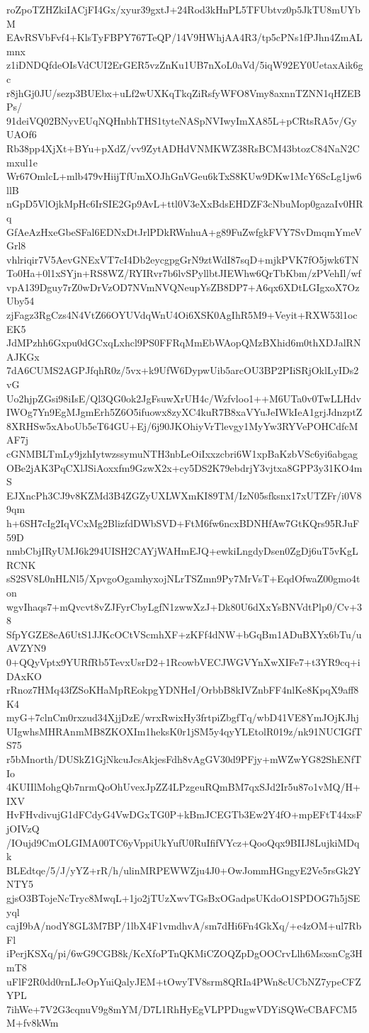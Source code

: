 roZpoTZHZkiIACjFI4Gx/xyur39gxtJ+24Rod3kHnPL5TFUbtvz0p5JkTU8mUYbM
EAvRSVbFvf4+KlsTyFBPY767TeQP/14V9HWhjAA4R3/tp5cPNs1fPJhn4ZmALmnx
z1iDNDQfdeOIsVdCUI2ErGER5vzZnKu1UB7nXoL0aVd/5iqW92EY0UetaxAik6gc
r8jhGj0JU/sezp3BUEbx+uLf2wUXKqTkqZiRsfyWFO8Vmy8axnnTZNN1qHZEBPs/
91deiVQ02BNyvEUqNQHnbhTHS1tyteNASpNVIwyImXA85L+pCRtsRA5v/GyUAOf6
Rb38pp4XjXt+BYu+pXdZ/vv9ZytADHdVNMKWZ38RsBCM43btozC84NaN2Cmxul1e
Wr67OmlcL+mlb479vHiijTfUmXOJhGnVGeu6kTxS8KUw9DKw1McY6ScLg1jw6llB
nGpD5VlOjkMpHc6IrSIE2Gp9AvL+ttl0V3eXxBdsEHDZF3cNbuMop0gazaIv0HRq
GfAeAzHxeGbeSFal6EDNxDtJrlPDkRWnhuA+g89FuZwfgkFVY7SvDmqmYmeVGrl8
vhlriqir7V5AevGNExVT7cI4Db2eycgpgGrN9ztWdI87sqD+mjkPVK7fO5jwk6TN
To0Ha+0l1xSYjn+RS8WZ/RYIRvr7b6lvSPyllbtJIEWhw6QrTbKbm/zPVehIl/wf
vpA139Dguy7rZ0wDrVzOD7NVmNVQNeupYsZB8DP7+A6qx6XDtLGIgxoX7OzUby54
zjFagz3RgCzs4N4VtZ66OYUVdqWnU4Oi6XSK0AgIhR5M9+Veyit+RXW53l1ocEK5
JdMPzhh6Gxpu0dGCxqLxhcl9PS0FFRqMmEbWAopQMzBXhid6m0thXDJalRNAJKGx
7dA6CUMS2AGPJfqhR0z/5vx+k9UfW6DypwUib5arcOU3BP2PIiSRjOklLyIDs2vG
Uo2hjpZGsi98iIsE/Ql3QG0ok2JgFsuwXrUH4c/Wzfvloo1++M6UTa0v0TwLLHdv
IWOg7Yn9EgMJgmErh5Z6O5ifuowx8zyXC4kuR7B8xaVYuJeIWkIeA1grjJdnzptZ
8XRHSw5xAboUb5eT64GU+Ej/6j90JKOhiyVrTlevgy1MyYw3RYVePOHCdfcMAF7j
cGNMBLTmLy9jzhIytwzssymuNTH3nbLeOiIxxzcbri6W1xpBaKzbVSc6yi6abgag
OBe2jAK3PqCXlJSiAoxxfm9GzwX2x+cy5DS2K79ebdrjY3vjtxa8GPP3y31KO4mS
EJXncPh3CJ9v8KZMd3B4ZGZyUXLWXmKI89TM/IzN05sfksnx17xUTZFr/i0V89qm
h+6SH7cIg2IqVCxMg2BlizfdDWbSVD+FtM6fw6ncxBDNHfAw7GtKQrs95RJuF59D
nmbCbjIRyUMJ6k294UISH2CAYjWAHmEJQ+ewkiLngdyDsen0ZgDj6uT5vKgLRCNK
sS2SV8L0nHLNl5/XpvgoOgamhyxojNLrTSZmn9Py7MrVsT+EqdOfwaZ00gmo4ton
wgvIhaqs7+mQvcvt8vZJFyrCbyLgfN1zwwXzJ+Dk80U6dXxYsBNVdtPlp0/Cv+38
SfpYGZE8eA6UtS1JJKcOCtVScmhXF+zKFf4dNW+bGqBm1ADuBXYx6bTu/uAVZYN9
0+QQyVptx9YURfRb5TevxUsrD2+1RcowbVECJWGVYnXwXIFe7+t3YR9cq+iDAxKO
rRnoz7HMq43fZSoKHaMpREokpgYDNHeI/OrbbB8kIVZnbFF4nlKe8KpqX9aff8K4
myG+7clnCm0rxzud34XjjDzE/wrxRwixHy3frtpiZbgfTq/wbD41VE8YmJOjKJhj
UIgwhsMHRAnmMB8ZKOXIm1heksK0r1jSM5y4qyYLEtolR019z/nk91NUCIGfTS75
r5bMnorth/DUSkZ1GjNkcuJcsAkjesFdh8vAgGV30d9PFjy+mWZwYG82ShENfTIo
4KUIIlMohgQb7nrmQoOhUvexJpZZ4LPzgeuRQmBM7qxSJd2Ir5u87o1vMQ/H+IXV
HvFHvdivujG1dFCdyG4VwDGxTG0P+kBmJCEGTb3Ew2Y4fO+mpEFtT44xsFjOIVzQ
/IOujd9CmOLGIMA00TC6yVppiUkYufU0RuIfifVYcz+QooQqx9BIIJ8LujkiMDqk
BLEdtqe/5/J/yYZ+rR/h/ulinMRPEWWZju4J0+OwJommHGngyE2Ve5rsGk2YNTY5
gjsO3BTojeNcTryc8MwqL+1jo2jTUzXwvTGsBxOGadpsUKdoO1SPDOG7h5jSEyql
cajI9bA/nodY8GL3M7BP/1lbX4F1vmdhvA/sm7dHi6Fn4GkXq/+e4zOM+ul7RbFl
iPerjKSXq/pi/6wG9CGB8k/KcXfoPTnQKMiCZOQZpDgOOCrvLlh6MsxsnCg3HmT8
uFlF2R0dd0rnLJeOpYuiQalyJEM+tOwyTV8srm8QRIa4PWn8cUCbNZ7ypeCFZYPL
7ihWe+7V2G3cqnuV9g8mYM/D7L1RhHyEgVLPPDugwVDYiSQWeCBAFCM5M+fv8kWm
